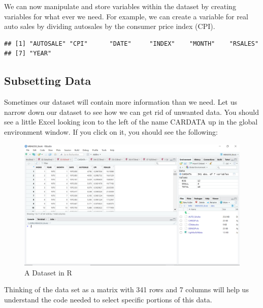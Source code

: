 \documentclass[
]{book}
\newenvironment{Shaded}{\begin{snugshade}}{\end{snugshade}}
\newcommand{\FunctionTok}[1]{\textcolor[rgb]{0.13,0.29,0.53}{\textbf{#1}}}
\newcommand{\NormalTok}[1]{#1}
\newcommand{\OtherTok}[1]{\textcolor[rgb]{0.56,0.35,0.01}{#1}}
\newcommand{\SpecialCharTok}[1]{\textcolor[rgb]{0.81,0.36,0.00}{\textbf{#1}}}
\begin{document}
We can now manipulate and store variables within the dataset by creating variables for what ever we need. For example, we can create a variable for real auto sales by dividing autosales by the consumer price index (CPI).

\begin{Shaded}
\end{Shaded}

\begin{verbatim}
## [1] "AUTOSALE" "CPI"      "DATE"     "INDEX"    "MONTH"    "RSALES"  
## [7] "YEAR"
\end{verbatim}

\subsection{Subsetting Data}\label{subsetting-data}

Sometimes our dataset will contain more information than we need. Let us narrow down our dataset to see how we can get rid of unwanted data. You should see a little Excel looking icon to the left of the name CARDATA up in the global environment window. If you click on it, you should see the following:

\begin{figure}

{\centering \includegraphics[width=0.75\linewidth]{images/Screenshot4} 

}

\caption{A Dataset in R}\label{fig:unnamed-chunk-41}
\end{figure}

Thinking of the data set as a matrix with 341 rows and 7 columns will help us understand the code needed to select specific portions of this data.
\end{document}
